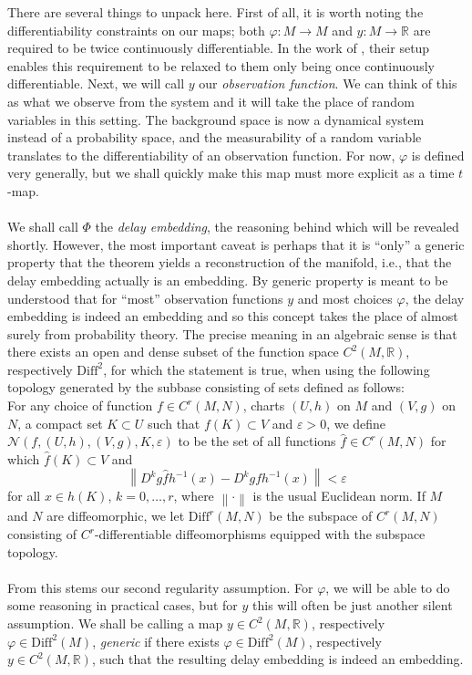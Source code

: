 \documentclass[11pt, a4paper]{memoir}
\theoremstyle{break}
\theoremstyle{break}
\theoremstyle{nonumberplain}
\newcommand{\mR}{\mathbb{R}}
\newcommand{\norm}[1]{\left\lVert#1\right\rVert}
\begin{document}
There are several things to unpack here. First of all, it is worth noting the differentiability constraints on our maps; both $\varphi: M\to M$ and $y:M\to\mR$ are required to be twice continuously differentiable. In the work of \cite{Sauer1991}, their setup enables this requirement to be relaxed to them only being once continuously differentiable. Next, we will call $y$ our \textit{observation function}. We can think of this as what we observe from the system and it will take the place of random variables in this setting. The background space is now a dynamical system instead of a probability space, and the measurability   of a random variable translates to the differentiability of an observation function. For now, $\varphi$ is defined very generally, but we shall quickly make this map must more explicit as a time $t$-map.\\\\
We shall call $\Phi$ the \textit{delay embedding}, the reasoning behind which will be revealed shortly. However, the most important caveat is perhaps that it is \enquote{only} a generic property that the theorem yields a reconstruction of the manifold, i.e., that the delay embedding actually is an embedding. By generic property is meant to be understood that for \enquote{most} observation functions $y$ and most choices $\varphi$, the delay embedding is indeed an embedding and so this concept takes the place of almost surely from probability theory. The precise meaning in an algebraic sense is that there exists an open and dense subset of the function space $C^2(M,\mR)$, respectively $\text{Diff}^2$, for which the statement is true, when using the following topology generated by the subbase consisting of sets defined as follows:\\[5pt]
For any choice of function $f\in C^r(M,N)$, charts $(U,h)$ on $M$ and $(V,g)$ on $N$, a compact set $K\subset U$ such that $f(K)\subset V$ and $\varepsilon>0$, we define $\mathcal{N}(f,(U,h),(V,g),K,\varepsilon)$ to be the set of all functions $\hat{f}\in C^r(M,N)$ for which $\hat{f}(K)\subset V$ and
$$\norm{D^kg\hat{f}h^{-1}(x)-D^kgfh^{-1}(x)}<\varepsilon$$
for all $x\in h(K)$, $k=0,\ldots,r$, where $\norm{\cdot}$ is the usual Euclidean norm. If $M$ and $N$ are diffeomorphic, we let $\text{Diff}^r(M,N)$ be the subspace of $C^r(M,N)$ consisting of $C^r$-differentiable diffeomorphisms equipped with the subspace topology.\\\\
From this stems our second regularity assumption. For $\varphi$, we will be able to do some reasoning in practical cases, but for $y$ this will often be just another silent assumption. We shall be calling a map $y\in C^2(M,\mR)$, respectively $\varphi\in \text{Diff}^2(M)$, \textit{generic} if there exists $\varphi\in \text{Diff}^2(M)$, respectively $y\in C^2(M,\mR)$, such that the resulting delay embedding is indeed an embedding.
\end{document}
